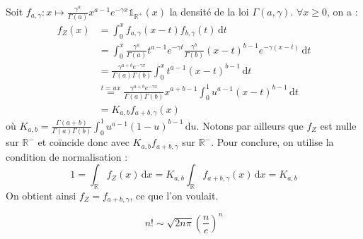 	\begin{demonstration}
		Soit $f_{a,\gamma} : x \mapsto \frac{\gamma^a}{\Gamma(a)} x^{a-1} e^{-\gamma x} \mathbb{1}_{\mathbb{R}^+}(x)$ la densité de la loi $\Gamma(a, \gamma)$. $\forall x \geq 0$, on a :
		\begin{align*}
			f_Z(x) & = \int_0^x f_{a, \gamma}(x-t)f_{b, \gamma}(t) \, \mathrm{d}t \\
			& = \int_0^x \frac{\gamma^a}{\Gamma(a)} t^{a-1} e^{-\gamma t} \frac{\gamma^b}{\Gamma(b)} (x-t)^{b-1} e^{-\gamma (x-t)} \, \mathrm{d}t \\
			& = \frac{\gamma^{a+b} e^{-\gamma x}}{\Gamma(a) \Gamma(b)} \int_0^x t^{a-1} (x-t)^{b-1} \, \mathrm{d}t \\
			& \overset{t=ux}{=} \frac{\gamma^{a+b} e^{-\gamma x}}{\Gamma(a) \Gamma(b)} x^{a+b-1} \int_0^1 u^{a-1} (x-t)^{b-1} \, \mathrm{d}t \\
			& = K_{a,b} f_{a+b, \gamma}(x)
		\end{align*}
		où $K_{a,b} = \frac{\Gamma(a+b)}{\Gamma(a) \Gamma(b)} \int_0^1 u^{a-1} (1-u)^{b-1} \, \mathrm{d}u$. Notons par ailleurs que $f_Z$ est nulle sur $\mathbb{R}^-$ et coïncide donc avec $K_{a,b} f_{a+b, \gamma}$ sur $\mathbb{R}^-$.
		\newpar
		Pour conclure, on utilise la condition de normalisation :
		\[ 1 = \int_{\mathbb{R}} f_Z(x) \, \mathrm{d}x = K_{a,b} \int_{\mathbb{R}} f_{a+b, \gamma}(x) \, \mathrm{d}x = K_{a,b} \]
		On obtient ainsi $f_Z = f_{a+b, \gamma}$, ce que l'on voulait.
	\end{demonstration}


	\begin{theorem}
		\[ n! \sim \sqrt{2n\pi} \left(\frac{n}{e} \right)^n \]
	\end{theorem}

